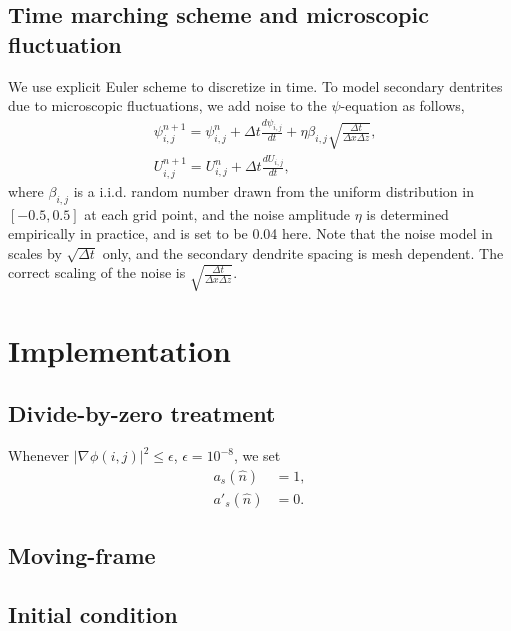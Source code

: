 \documentclass[final,times]{elsarticle}
\numberwithin{equation}{section}
\newcommand{\grad}[1]{\nabla_{#1}}
\begin{document}
\subsection{Time marching scheme and microscopic fluctuation}
We use explicit Euler scheme to discretize  in time. To model secondary dentrites due to microscopic fluctuations, we add noise to the $\psi$-equation as follows,
\begin{align}
& \psi_{i,j}^{n+1} = \psi_{i,j}^n + \Delta t  \frac{d \psi_{i,j}}{dt}  + \eta \beta_{i,j} \sqrt{ \frac{\Delta t}{ \Delta x \Delta z}  },  \\
& U_{i,j} ^{n+1} = U_{i,j}^n + \Delta t \frac{dU_{i,j}}{dt},
\end{align}
where $\beta_{i,j}$ is a i.i.d. random number drawn from the uniform distribution in $[-0.5,0.5]$ at each grid point, and the noise amplitude $\eta$ is determined empirically in practice, and is set to be 0.04 here. Note that the noise model in \cite{Tourret2015} scales by $\sqrt{\Delta t}$ only, and the secondary dendrite spacing is mesh dependent. The correct scaling of the noise is $\sqrt{ \frac{\Delta t}{ \Delta x \Delta z}  }$.

\section{Implementation}


\subsection{Divide-by-zero treatment}
Whenever $|\grad{}\phi(i,j)|^{2} \leq \epsilon $, $\epsilon = 10^{-8}$, we set \cite{Provatas2010}
\begin{align*}
a_s(\hat{n}) &= 1, \\
a'_s(\hat{n}) &= 0.
\end{align*}

\subsection{Moving-frame}

\subsection{Initial condition}
\end{document}
